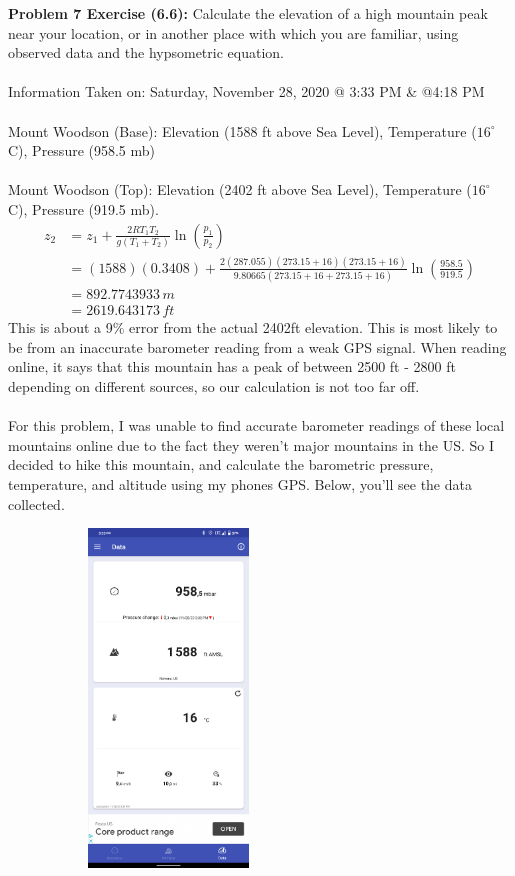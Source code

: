 \documentclass[11pt]{article}
\newenvironment{problem}[1]{\textbf{Problem #1:}}{\newpage}
\begin{document}
	\begin{problem}{7 Exercise (6.6)}
		Calculate the elevation of a high mountain peak near your location, or in another place with which you are familiar, using observed data and the hypsometric equation.
		\\ \\
		Information Taken on: Saturday, November 28, 2020 @ 3:33 PM \& @4:18 PM
		\\ \\
		Mount Woodson (Base): Elevation (1588 ft above Sea Level), Temperature ($16^\circ$ C), Pressure (958.5 mb) 
		\\ \\
		Mount Woodson (Top): Elevation (2402 ft above Sea Level), Temperature ($16^\circ$ C), Pressure (919.5 mb).
		\begin{align*}
			z_2 &= z_1 + \frac{2RT_1T_2}{g(T_1 + T_2)}\ln\left(\frac{p_1}{p_2}\right) \\
			&= (1588)(0.3408) + \frac{2(287.055)(273.15 + 16)(273.15 + 16)}{9.80665(273.15 + 16 + 273.15 + 16)}\ln\left(\frac{958.5}{919.5}\right) \\
			&= 892.7743933\,m \\
			&= 2619.643173\,ft
		\end{align*}
		This is about a 9\% error from the actual 2402ft elevation.  This is most likely to be from an inaccurate barometer reading from a weak GPS signal.  When reading online, it says that this mountain has a peak of between 2500 ft - 2800 ft depending on different sources, so our calculation is not too far off.
		\\ \\
		For this problem, I was unable to find accurate barometer readings of these local mountains online due to the fact they weren't major mountains in the US.  So I decided to hike this mountain, and calculate the barometric pressure, temperature, and altitude using my phones GPS.  Below, you'll see the data collected. 
		\\
		\begin{figure}[h!]
			\centering
			\begin{subfigure}{.4\textwidth}
				\centering
				\includegraphics[height = 9cm]{Figures/Prob7/Base.png}

\end{subfigure}
\end{figure}
\end{problem}
\end{document}
